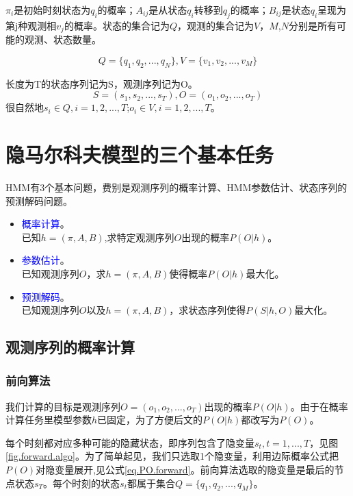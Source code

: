 \documentclass[]{article}
\begin{document}
   $\pi_{i}$是初始时刻状态为$q_{i}$的概率；$A_{ij}$是从状态$q_{i}$转移到$q_{j}$的概率；$B_{ij}$是状态$q_{i}$呈现为第j种观测相$v_{j}$的概率。状态的集合记为$Q$，观测的集合记为$V$，$M$,$N$分别是所有可能的观测、状态数量。
   
   \begin{equation}
   		Q=\{q_{1},q_{2},...,q_{N}\},   	V=\{v_{1},v_{2},...,v_{M}\}
   \end{equation}

   	长度为T的状态序列记为S，观测序列记为O。
   \begin{equation}
		S=(s_{1},s_{2},...,s_{T}),   	O=(o_{1},o_{2},...,o_{T})
   \end{equation}
    很自然地$s_{i}\in{Q},i=1,2,...,T$;$o_{i} \in V, i=1, 2, ..., T$。
    
\section{隐马尔科夫模型的三个基本任务}    
    HMM有3个基本问题，费别是观测序列的概率计算、HMM参数估计、状态序列的预测解码问题。
    
    \begin{itemize}
    	\item \textcolor{blue}{概率计算}。 \\已知$h=(\pi, A, B)$,求特定观测序列$O$出现的概率$P(O|h)$。
    	\item  \textcolor{blue}{参数估计}。 \\已知观测序列$O$，求$h=(\pi, A, B)$使得概率$P(O|h)$最大化。
    	\item  \textcolor{blue}{预测解码}。 \\已知观测序列$O$以及$h=(\pi, A, B)$，求状态序列使得$P(S|h,O)$最大化。
    \end{itemize}

\subsection{观测序列的概率计算}
 \subsubsection{前向算法}
    我们计算的目标是观测序列$O=(o_{1}, o_{2}, ..., o_{T})$出现的概率$P(O|h)$。由于在概率计算任务里模型参数$h$已固定，为了方便后文的$P(O|h)$都改写为$P(O)$。
    
    每个时刻都对应多种可能的隐藏状态，即序列包含了隐变量$s_{t},t=1,...,T$，见图\ref{fig.forward.algo}。为了简单起见，我们只选取1个隐变量，利用边际概率公式把$P(O)$对隐变量展开,见公式\ref{eq.PO.forward}。前向算法选取的隐变量是最后的节点状态$s_{T}$。每个时刻的状态$s_{t}$都属于集合$Q=\{q_{1},q_{2},...,q_{M}\}$。
    
\end{document}
